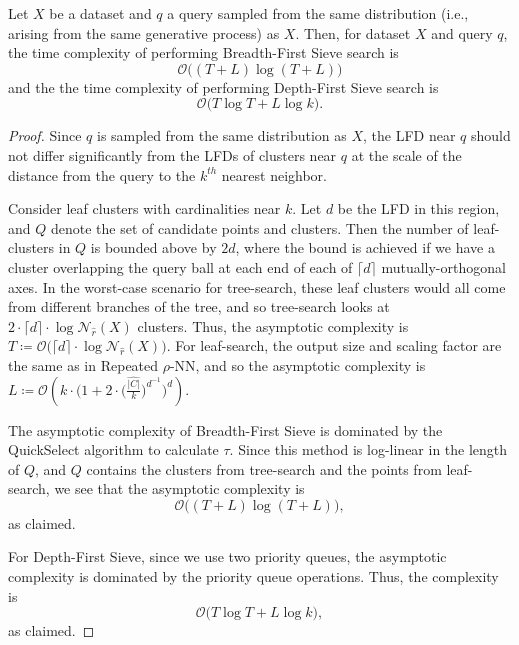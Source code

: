 \begin{theorem} 
    Let $X$ be a dataset and $q$ a query sampled from the same distribution (i.e., arising from the same generative process) as $X$. Then, for dataset $X$ and query $q$, the time complexity of performing Breadth-First Sieve search is \begin{equation}
        \mathcal{O} \Big( (T + L ) \log (T + L ) \Big)
        \label{eq:methods:breadth-first-sieve-complexity}
    \end{equation} and the the time complexity of performing Depth-First Sieve search is \begin{equation}
        \mathcal{O} \Big( T \log T + L \log k \Big).
        \label{eq:methods:depth-first-sieve-complexity}
    \end{equation}
\end{theorem}

\begin{proof}
Since $q$ is sampled from the same distribution as $X$, the LFD near $q$ should not differ significantly from the LFDs of clusters near $q$ at the scale of the distance from the query to the $k^{th}$ nearest neighbor.

Consider leaf clusters with cardinalities near $k$. Let $d$ be the LFD in this region, and $Q$ denote the set of candidate points and clusters.
Then the number of leaf-clusters in $Q$ is bounded above by $2d$, where the bound is achieved if we have a cluster overlapping the query ball at each end of each of $\lceil d \rceil$ mutually-orthogonal axes.
In the worst-case scenario for tree-search, these leaf clusters would all come from different branches of the tree, and so tree-search looks at $2 \cdot \lceil d \rceil \cdot \log \mathcal{N}_{\hat{r}}(X)$ clusters.
Thus, the asymptotic complexity is $T \coloneqq \mathcal{O} \big( \lceil d \rceil \cdot \log \mathcal{N}_{\hat{r}}(X) \big)$.
For leaf-search, the output size and scaling factor are the same as in Repeated $\rho$-NN, and so the asymptotic complexity is $L \coloneqq \mathcal{O} \left( k \cdot \bigg( 1 + 2 \cdot \Big( \frac{\hat{|C|}}{k} \Big) ^ {d^{-1}} \bigg)^d \right)$.

The asymptotic complexity of Breadth-First Sieve is dominated by the QuickSelect algorithm to calculate $\tau$.
Since this method is log-linear in the length of $Q$, and $Q$ contains the clusters from tree-search and the points from leaf-search, we see that the asymptotic complexity is
\begin{equation*}
    \mathcal{O} \Big( (T + L ) \log (T + L ) \Big),
\end{equation*} as claimed. 

For Depth-First Sieve, since we use two priority queues, the asymptotic complexity is dominated by the priority queue operations.
Thus, the complexity is
\begin{equation*}
    \mathcal{O} \Big( T \log T + L \log k \Big), 
\end{equation*} as claimed. 
\end{proof}

